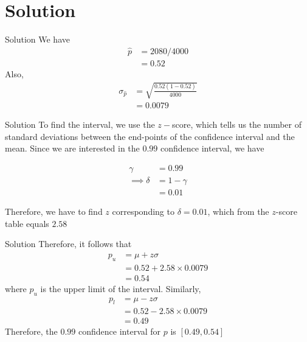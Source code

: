 \documentclass{beamer}
\begin{document}
\section{Solution}
\begin{frame}{Solution}
We have
\begin{align}
    \hat{p} &= 2080/4000 \\
            &= 0.52
 \end{align}
 Also,
     \begin{align}
    \sigma_{\hat{p}} &= \sqrt{\frac{0.52(1-0.52)}{4000}} \\
    &= 0.0079
 \end{align}


\end{frame}

\begin{frame}{Solution}
    To find the interval, we use the $z-$score, which tells us the number of standard deviations between the end-points of the confidence interval and the mean.
    Since we are interested in the $0.99$ confidence interval, we have
    
     \begin{align}
     \gamma &= 0.99 \\ 
     \implies \delta &= 1 - \gamma \\
     &= 0.01 
 \end{align}
 
 Therefore, we have to find $z$ corresponding to $\delta = 0.01$, which from the $z$-score table equals $2.58$
    
\end{frame}


\begin{frame}{Solution}
    Therefore, it follows that
    \begin{align}
        p_u &= \mu + z\sigma \\
        &= 0.52 + 2.58 \times 0.0079 \\
        &= 0.54
    \end{align}
    where $p_u$ is the upper limit of the interval. Similarly, 
    \begin{align}
        p_l &= \mu - z\sigma \\
        &= 0.52 - 2.58 \times 0.0079 \\
        &= 0.49
    \end{align}
    Therefore, the $0.99$ confidence interval for $p$ is $[0.49,0.54]$
\end{frame}
\end{document}
